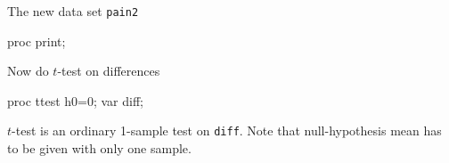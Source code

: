 \documentclass[unknownkeysallowed]{beamer}\usepackage[]{graphicx}\usepackage[]{color}
\begin{document}
\begin{frame}[fragile]{The new data set \texttt{pain2}}
  \begin{Sascode}[store=iy]
proc print;    
  \end{Sascode}
  
\end{frame}

\begin{frame}[fragile]{Now do $t$-test on differences}


\begin{Sascode}[store=id]
  proc ttest h0=0;
    var diff;
\end{Sascode}


$t$-test is an ordinary 1-sample test on \texttt{diff}. Note that
null-hypothesis mean has to be given with only one sample.


  
\end{frame}

\end{document}
